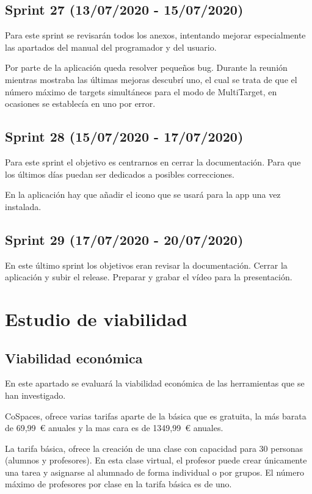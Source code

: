   \subsection{Sprint 27 (13/07/2020 - 15/07/2020)} 
 Para este sprint se revisarán todos los anexos, intentando mejorar especialmente las apartados del manual del programador y del usuario.
 
Por parte de la aplicación queda resolver pequeños bug. Durante la reunión mientras mostraba las últimas mejoras descubrí uno, el cual se trata de que el número máximo de targets simultáneos para el modo de MultiTarget, en ocasiones se establecía en uno por error.

 \subsection{Sprint 28 (15/07/2020 - 17/07/2020)}
  Para este sprint el objetivo es centrarnos en cerrar la documentación. Para que los últimos días puedan ser dedicados a posibles correcciones.
  
  En la aplicación hay que añadir el icono que se usará para la app una vez instalada.
  
\subsection{Sprint 29 (17/07/2020 - 20/07/2020)}
En este último sprint los objetivos eran revisar la documentación. Cerrar la aplicación y subir el release. Preparar y grabar el vídeo para la presentación.
  
\section{Estudio de viabilidad}

\subsection{Viabilidad económica}

En este apartado se evaluará la viabilidad económica de las herramientas que se han investigado.


CoSpaces, ofrece varias tarifas aparte de la básica que es gratuita, la más barata de 69,99~\euro{}  anuales y la mas cara es de 1349,99~\euro{} anuales.

La tarifa básica, ofrece la creación de una clase con capacidad para 30 personas (alumnos y profesores). En esta clase virtual, el profesor puede crear únicamente una tarea y asignarse al alumnado de forma individual o por grupos. El número máximo de profesores por clase en la tarifa básica es de uno.

